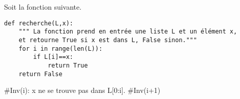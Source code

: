 Soit la fonction suivante.
\begin{lstlisting}
def recherche(L,x):
    """ La fonction prend en entrée une liste L et un élément x,
    et retourne True si x est dans L, False sinon."""
    for i in range(len(L)):
        if L[i]==x:
            return True
    return False
\end{lstlisting}

\ifprof
\begin{corrige}
#Inv(i): x ne se trouve pas dans L[0:i].
#Inv(i+1)
\end{corrige}
\else
\fi
